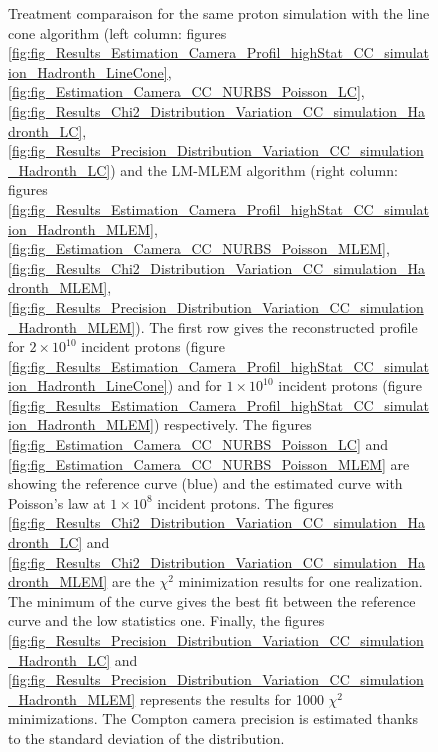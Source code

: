 \begin{figure} [!h]
\caption{Treatment comparaison for the same proton simulation with the line cone algorithm (left column: figures \ref{fig:fig_Results_Estimation_Camera_Profil_highStat_CC_simulation_Hadronth_LineCone}, \ref{fig:fig_Estimation_Camera_CC_NURBS_Poisson_LC}, \ref{fig:fig_Results_Chi2_Distribution_Variation_CC_simulation_Hadronth_LC}, \ref{fig:fig_Results_Precision_Distribution_Variation_CC_simulation_Hadronth_LC}) and the LM-MLEM algorithm (right column: figures \ref{fig:fig_Results_Estimation_Camera_Profil_highStat_CC_simulation_Hadronth_MLEM}, \ref{fig:fig_Estimation_Camera_CC_NURBS_Poisson_MLEM}, \ref{fig:fig_Results_Chi2_Distribution_Variation_CC_simulation_Hadronth_MLEM}, \ref{fig:fig_Results_Precision_Distribution_Variation_CC_simulation_Hadronth_MLEM}). The first row gives the reconstructed profile for $2\times10^{10}$ incident protons (figure \ref{fig:fig_Results_Estimation_Camera_Profil_highStat_CC_simulation_Hadronth_LineCone}) and for $1\times10^{10}$ incident protons (figure \ref{fig:fig_Results_Estimation_Camera_Profil_highStat_CC_simulation_Hadronth_MLEM}) respectively. The figures \ref{fig:fig_Estimation_Camera_CC_NURBS_Poisson_LC} and \ref{fig:fig_Estimation_Camera_CC_NURBS_Poisson_MLEM} are showing the reference curve (blue) and the estimated curve with Poisson's law at $1\times10^8$ incident protons. The figures \ref{fig:fig_Results_Chi2_Distribution_Variation_CC_simulation_Hadronth_LC} and \ref{fig:fig_Results_Chi2_Distribution_Variation_CC_simulation_Hadronth_MLEM} are the $\chi^2$ minimization results for one realization. The minimum of the curve gives the best fit between the reference curve and the low statistics one. Finally, the figures  \ref{fig:fig_Results_Precision_Distribution_Variation_CC_simulation_Hadronth_LC} and \ref{fig:fig_Results_Precision_Distribution_Variation_CC_simulation_Hadronth_MLEM} represents the results for 1000 $\chi^2$ minimizations. The Compton camera precision is estimated thanks to the standard deviation of the distribution. }
\end{figure}

